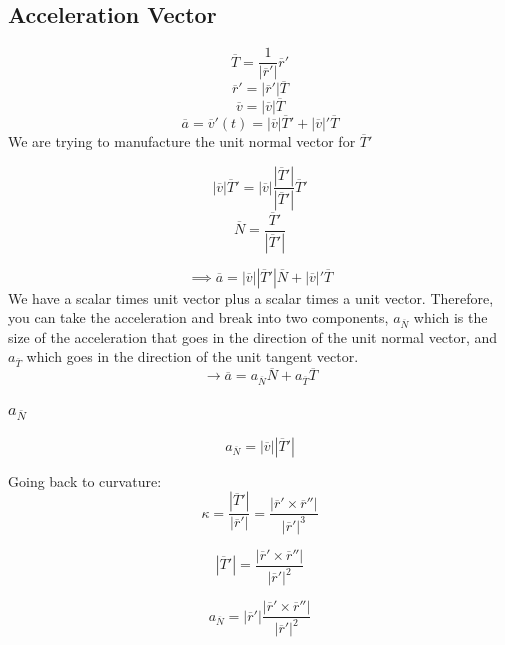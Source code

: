 \subsection{Acceleration Vector}%
\label{sub:acceleration_vector}

\[\overline{T} = \frac{1}{\left| \overline{r}' \right| }\overline{r}'\]
\[\overline{r}' = \left| \overline{r}' \right| \overline{T}\]
\[\overline{v} = \left| \overline{v} \right| \overline{T}\]
\[\overline{a} = \overline{v}'(t) = \left| \overline{v} \right| \overline{T}' + \left| \overline{v} \right|' \overline{T} \]
We are trying to manufacture the unit normal vector for $\overline{T}'$

\[\left| \overline{v} \right| \overline{T}' = \left| \overline{v} \right| \frac{\left| \overline{T}' \right| }{\left| \overline{T}' \right| }\overline{T}'\]
\[\overline{N} = \frac{\overline{T}'}{\left| \overline{T}' \right| }\]

\[\implies \overline{a} = \left| \overline{v} \right| \left| \overline{T}' \right| \overline{N} + \left| \overline{v} \right| ' \overline{T}\]
We have a scalar times unit vector plus a scalar times a unit vector. Therefore, you can take the acceleration
and break into two components, $a_{\overline{N}}$ which is the size of the acceleration that goes in the
direction of the unit normal vector, and $a_{\overline{T}}$ which goes in the direction of
the unit tangent vector.
\[\to \overline{a} = a_{\overline{N}}\overline{N} + a_{\overline{T}}\overline{T}\]

\subsubsection{$a_{\overline{N}}$}%
\label{ssub:_a__n_}

\[a_{\overline{N}} = \left| \overline{v} \right| \left| \overline{T}' \right| \]

Going back to curvature:
\[\kappa = \frac{\left| \overline{T}' \right| }{\left| \overline{r}' \right| } = \frac{\left| \overline{r}' \times \overline{r}'' \right| }{\left| \overline{r}' \right|^3}\]

\[\left| \overline{T}' \right| = \frac{\left| \overline{r}' \times \overline{r}'' \right| }{\left| \overline{r}' \right|^2} \]

\[a_{\overline{N}} =
\left| \overline{r}' \right|
\frac{\left|   \overline{r}' \times  \overline{r}''\right|}{\left| \overline{r}' \right|^2 }\]



